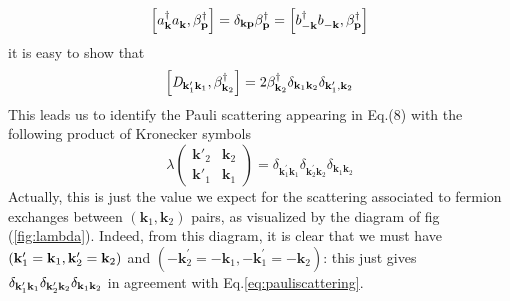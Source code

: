 \documentclass[aps,prb,superscriptaddress,twocolumn]{revtex4}
\newcommand{\vk}{\ensuremath{\mathbf{k}}}
\begin{document}
\begin{equation}  \label{eq:aBeta}
\left[a^{\dagger}_{\mathbf{k} }a^{}_{\mathbf{k} },\beta^{\dagger}_{\mathbf{p}
}\right]  =\delta_{\mathbf{k} \mathbf{p} }\beta^{\dagger}_{\mathbf{p} }=%
\left[b^{\dagger}_{-\mathbf{k} }b^{}_{-\mathbf{k} },\beta^{\dagger}_{\mathbf{%
p} }\right]  
\end{equation}
it is easy to show that 
\begin{equation}  \label{eq:Dcom}
\left[\mathit{D} _{\mathbf{k} ^{\prime}_1\mathbf{k} _1},\beta^{\dagger}_{%
\mathbf{k} _2}\right]  =2\beta^{\dagger}_{\mathbf{k} _2}\delta_{\mathbf{k} _1%
\mathbf{k} _2}\delta_{\mathbf{k} ^{\prime}_1,\mathbf{k} _2}
\end{equation}
This leads us to identify the Pauli scattering appearing in Eq.(8) with the following
product of Kronecker symbols 
\begin{equation}  \label{eq:pauliscattering}
\lambda\left(\begin{smallmatrix}\vk'_2&\vk_2\\\vk'_1&\vk_1\end{smallmatrix}%
\right)  =\delta_{\mathbf{k} ^{\prime}_1\mathbf{k} _1}\delta_{\mathbf{k}
^{\prime}_2\mathbf{k} _2}\delta_{\mathbf{k} _1\mathbf{k} _2}
\end{equation}
Actually, this is just the value we expect for the scattering associated to
fermion exchanges between $\left(\mathbf{k} _1,\mathbf{k} _2\right) $ pairs,
as visualized by the diagram of fig (\ref{fig:lambda}). Indeed, from this
diagram, it is clear that we must have $\left(\mathbf{k} ^{\prime}_1=\mathbf{%
k} _1,\mathbf{k} ^{\prime}_2=\mathbf{k} _2\right) $ and $\left(-\mathbf{k}
^{\prime}_2=-\mathbf{k} _1,-\mathbf{k} ^{\prime}_1=-\mathbf{k} _2\right) $:
this just gives $\delta_{\mathbf{k} ^{\prime}_1\mathbf{k} _1}\delta_{\mathbf{%
k} ^{\prime}_2\mathbf{k} _2}\delta_{\mathbf{k} _1\mathbf{k} _2}$ in
agreement with Eq.\eqref{eq:pauliscattering}.
\end{document}
